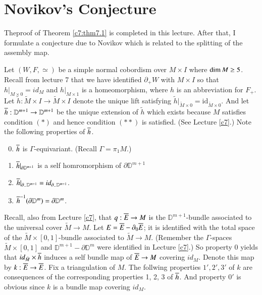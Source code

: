\chapter{Novikov's Conjecture}\label{c8}

The\pageoriginale proof of Theorem \ref{c7:thm7.1} is completed in this
lecture. After that, I formulate a conjecture due to Novikov which is
related to the splitting of the assembly map.

Let $(W, F , \simeq)$ be a simple normal cobordism over $M \times I$
where $\dim\break M \geq 5$. Recall from lecture 7 that we have identified
$\partial _+ W$ with $M \times I$ so that $h|_{M \times 0}= id_{M}$
and $h|_{M \times 1}$ is a homeomorphism, where $h$ is an abbreviation
for $F_+$. Let $\tilde{h}: \tilde{M} \times I \to \tilde{M} \times I$
denote the unique lift satisfying $\tilde{h}|_{\tilde{M} \times
  0}=\text{id}_{\tilde{M}\times 0}$. And let $\overline{h}: \mathbb{D}^{m+1} \to \mathbb{D}^{m+1}$ be the
unique extension of $\tilde{h}$ which exists because $M$ satisfies
condition $(*)$ and hence condition $(**)$ is satisfied. (See Lecture
\ref{c7}.) Note the following properties of $\overline{h}$.

\begin{enumerate}
\setcounter{enumi}{-1}
\item $\overline{h}$ is $\Gamma$-equivariant. (Recall $\Gamma = \pi_1 M$.)
  \item $\overline{h}|_{\partial \mathbb{D}^{m+1}}$ is a self homromorphism
    of $\partial \mathbb{D}^{m+1}$
    \item $\overline{h}|_{\partial _- \mathbb{D}^{m+1}}= id_{\partial_-
      \mathbb{D}^{m+1}}$.
      \item $\overline{h}^{-1} (\partial \mathbb{D}^m)= \partial \mathbb{D}^m$.
\end{enumerate}

Recall, also from Lecture \ref{c7}, that $q: \overline{E} \to M$ is the
$\mathbb{D}^{m+1}$-bundle associated to the universal cover $\tilde{M}
\to M$. Let $E = \overline{E}- \partial_0 \overline{E}$; it is identified with the
total space of the $\tilde{M} \times [0, 1]$-bundle associated to
$\tilde{M} \to M$. (Remember the $\Gamma$-spaces $\tilde{M} \times [0,
1]$ and $\mathbb{D}^{m+1}- \partial \mathbb{D}^m$ were identified in
Lecture \ref{c7}.) So property 0 yields that $id_{\tilde{M}} \times
\overline{h}$ induces a self bundle map of $\overline{E} \to M$ covering
$id_M$. Denote this map by $k: \overline{E} \to \overline{E}$. Fix a triangulation
of $M$. The follwing properties $1', 2', 3'$ of $k$ are consequences
of the corresponding properties 1, 2, 3 of $\overline{h}$. And property $0'$
is obvious since $k$ is a bundle map covering $id_M$.


